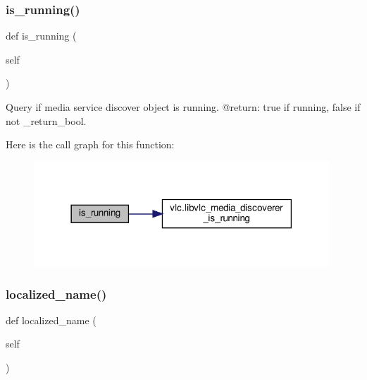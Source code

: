 \subsubsection{\texorpdfstring{is\+\_\+running()}{is\_running()}}
{\footnotesize\ttfamily def is\+\_\+running (\begin{DoxyParamCaption}\item[{}]{self }\end{DoxyParamCaption})}

\begin{DoxyVerb}Query if media service discover object is running.
@return: true if running, false if not \libvlc_return_bool.
\end{DoxyVerb}
 Here is the call graph for this function\+:
\nopagebreak
\begin{figure}[H]
\begin{center}
\leavevmode
\includegraphics[width=314pt]{classvlc_1_1_media_discoverer_a74c01da18dc77cb449d3f428bd16d73a_cgraph}
\end{center}
\end{figure}
\mbox{\label{classvlc_1_1_media_discoverer_a5ac963c487dc1a0a02e21863b0b957c9}} 
\subsubsection{\texorpdfstring{localized\+\_\+name()}{localized\_name()}}
{\footnotesize\ttfamily def localized\+\_\+name (\begin{DoxyParamCaption}\item[{}]{self }\end{DoxyParamCaption})}

